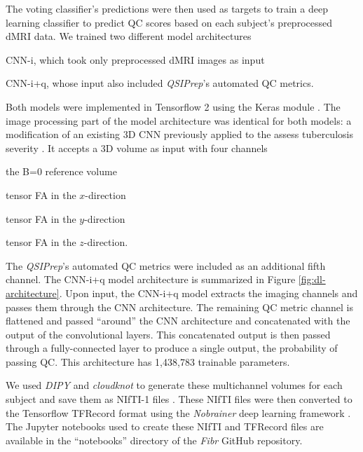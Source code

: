 \documentclass[fleqn,10pt]{wlscirep}
\begin{document}
The voting classifier's predictions were then used as targets to train a deep
learning classifier to predict QC scores based on each subject's preprocessed
dMRI data. We trained two different model architectures
\begin{enumerate*}[%
    label=(\roman*),%
    before=\unskip{: },%
    itemjoin={{, }},%
    itemjoin*={{ and }}]
    \item CNN-i, which took only preprocessed dMRI images as input
    \item CNN-i+q, whose input also included \emph{QSIPrep}'s automated QC metrics.
\end{enumerate*}
Both models were implemented in Tensorflow 2 \cite{tensorflow} using the Keras
module \cite{keras}. The image processing part of the model architecture was
identical for both models: a modification of an existing 3D CNN
\cite{zunair2020-bs} previously applied to the assess tuberculosis severity
\cite{dicente2019clef}. It accepts a 3D volume as input with four channels
\begin{enumerate*}[%
    label=(\roman*),%
    before=\unskip{: },%
    itemjoin={{, }},%
    itemjoin*={{ and }}]
    \item the B=0 reference volume
    \item tensor FA in the $x$-direction
    \item tensor FA in the $y$-direction
    \item tensor FA in the $z$-direction.
\end{enumerate*}
The \emph{QSIPrep}'s automated QC metrics were included as an additional fifth
channel. The CNN-i+q model architecture is summarized in Figure
\ref{fig:dl-architecture}. Upon input, the CNN-i+q model extracts the imaging
channels and passes them through the CNN architecture. The remaining QC metric
channel is flattened and passed ``around'' the CNN architecture and concatenated
with the output of the convolutional layers. This concatenated output is then
passed through a fully-connected layer to produce a single output, the
probability of passing QC. This architecture has 1,438,783 trainable parameters.

We used \emph{DIPY} \cite{dipy} and \emph{cloudknot} \cite{cloudknot} to
generate these multichannel volumes for each subject and save them as NIfTI-1
files \cite{nifti}. These NIfTI files were then converted to the Tensorflow
TFRecord format using the \emph{Nobrainer} deep learning framework
\cite{nobrainer}.
The Jupyter notebooks used to create these NIfTI and TFRecord files are
available in the ``notebooks'' directory of the \emph{Fibr} GitHub
repository.
\end{document}
